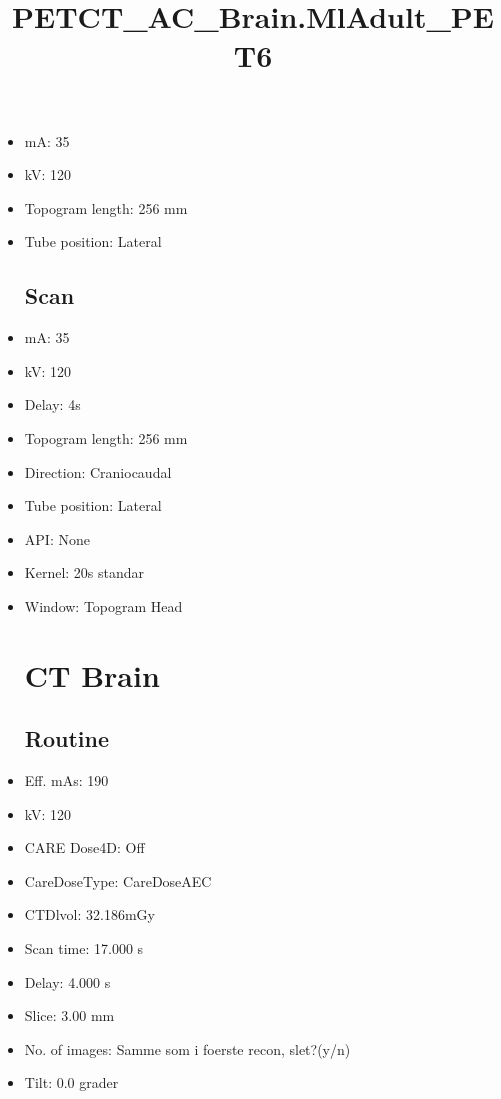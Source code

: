 \documentclass[12pt]{article}
\title{PETCT\_AC\_Brain.MlAdult\_PET6}
\begin{document}
\maketitle
\newpage
\tableofcontents
\newpage
{}


\begin{itemize}\section{Topogram}
\subsection{Routine}
\item mA: 35\item kV: 120\item Topogram length: 256 mm\item Tube position: Lateral
\subsection{Scan}\item mA: 35\item kV: 120\item Delay: 4s\item Topogram length: 256 mm\item Direction: Craniocaudal\item Tube position: Lateral\item API: None\item Kernel: 20s standar\item Window: Topogram Head
\section{CT Brain}
\subsection{Routine}
\item Eff. mAs: 190\item kV: 120\item CARE Dose4D: Off\item CareDoseType: CareDoseAEC\item CTDlvol: 32.186mGy\item Scan time: 17.000 s\item Delay: 4.000 s\item Slice: 3.00 mm\item No. of images: Samme som i foerste recon, slet?(y/n)\item Tilt: 0.0 grader

\end{itemize}
\end{document}
